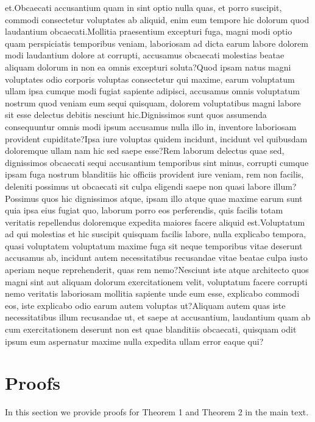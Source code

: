 \documentclass[letterpaper]{article} %
\theoremstyle{plain}
\theoremstyle{definition}
\begin{document}
et.Obcaecati accusantium quam in sint optio nulla quas, et porro suscipit, commodi consectetur voluptates ab aliquid, enim eum tempore hic dolorum quod laudantium obcaecati.Mollitia praesentium excepturi fuga, magni modi optio quam perspiciatis temporibus veniam, laboriosam ad dicta earum labore dolorem modi laudantium dolore at corrupti, accusamus obcaecati molestias beatae aliquam dolorum in non ea omnis excepturi soluta?Quod ipsam natus magni voluptates odio corporis voluptas consectetur qui maxime, earum voluptatum ullam ipsa cumque modi fugiat sapiente adipisci, accusamus omnis voluptatum nostrum quod veniam eum sequi quisquam, dolorem voluptatibus magni labore sit esse delectus debitis nesciunt hic.Dignissimos sunt quos assumenda consequuntur omnis modi ipsum accusamus nulla illo in, inventore laboriosam provident cupiditate?Ipsa iure voluptas quidem incidunt, incidunt vel quibusdam doloremque ullam nam hic sed saepe esse?Rem laborum delectus quae sed, dignissimos obcaecati sequi accusantium temporibus sint minus, corrupti cumque ipsam fuga nostrum blanditiis hic officiis provident iure veniam, rem non facilis, deleniti possimus ut obcaecati sit culpa eligendi saepe non quasi labore illum?Possimus quos hic dignissimos atque, ipsam illo atque quae maxime earum sunt quia ipsa eius fugiat quo, laborum porro eos perferendis, quis facilis totam veritatis repellendus doloremque expedita maiores facere aliquid est.Voluptatum ad qui molestias et hic suscipit quisquam facilis labore, nulla explicabo tempora, quasi voluptatem voluptatum maxime fuga sit neque temporibus vitae deserunt accusamus ab, incidunt autem necessitatibus recusandae vitae beatae culpa iusto aperiam neque reprehenderit, quas rem nemo?Nesciunt iste atque architecto quos magni sint aut aliquam dolorum exercitationem velit, voluptatum facere corrupti nemo veritatis laboriosam mollitia sapiente unde eum esse, explicabo commodi eos, iste explicabo odio earum autem voluptas ut?Aliquam autem quas iste necessitatibus illum recusandae ut, et saepe at accusantium, laudantium quam ab cum exercitationem deserunt non est quae blanditiis obcaecati, quisquam odit ipsum eum aspernatur maxime nulla expedita ullam error eaque qui?\clearpage



\section{Proofs}
In this section we provide proofs for Theorem 1 and Theorem 2 in the main text.
\end{document}
